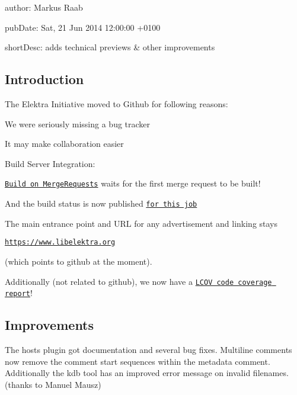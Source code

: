 
\begin{DoxyItemize}
\item author\+: Markus Raab
\item pub\+Date\+: Sat, 21 Jun 2014 12\+:00\+:00 +0100
\item short\+Desc\+: adds technical previews \& other improvements
\end{DoxyItemize}

\subsection*{Introduction}

The Elektra Initiative moved to Github for following reasons\+:


\begin{DoxyItemize}
\item We were seriously missing a bug tracker
\item It may make collaboration easier
\item Build Server Integration\+:
\begin{DoxyItemize}
\item \href{https://build.libelektra.org/job/elektra-mergerequests/}{\tt Build on Merge\+Requests} waits for the first merge request to be built!
\item And the build status is now published \href{https://build.libelektra.org/job/elektra-gcc47-all/}{\tt for this job}
\end{DoxyItemize}
\end{DoxyItemize}

The main entrance point and U\+RL for any advertisement and linking stays

\href{https://www.libelektra.org}{\tt https\+://www.\+libelektra.\+org}

(which points to github at the moment).

Additionally (not related to github), we now have a \href{https://doc.libelektra.org/coverage/latest/}{\tt L\+C\+OV code coverage report}!

\subsection*{Improvements}

The hosts plugin got documentation and several bug fixes. Multiline comments now remove the comment start sequences within the metadata comment. Additionally the kdb tool has an improved error message on invalid filenames. (thanks to Manuel Mausz)

